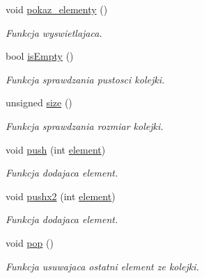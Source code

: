 \begin{DoxyCompactItemize}
void \hyperlink{classkolejka__tablica_ab6d165be6dfc519412499250722d1097}{pokaz\-\_\-elementy} ()
\begin{DoxyCompactList}\small\item\em Funkcja wyswietlajaca. \end{DoxyCompactList}\item 
bool \hyperlink{classkolejka__tablica_ad9c58be886c2a4ff8b94c135776442a4}{is\-Empty} ()
\begin{DoxyCompactList}\small\item\em Funkcja sprawdzania pustosci kolejki. \end{DoxyCompactList}\item 
unsigned \hyperlink{classkolejka__tablica_a6073b1f832606e6ff706577bc2699338}{size} ()
\begin{DoxyCompactList}\small\item\em Funkcja sprawdzania rozmiar kolejki. \end{DoxyCompactList}\item 
void \hyperlink{classkolejka__tablica_a080e798ff0e2f7168b41c96f3e46753a}{push} (int \hyperlink{classelement}{element})
\begin{DoxyCompactList}\small\item\em Funkcja dodajaca element. \end{DoxyCompactList}\item 
void \hyperlink{classkolejka__tablica_ae08cb58ee66340aeb5ef7462eaf05ed8}{pushx2} (int \hyperlink{classelement}{element})
\begin{DoxyCompactList}\small\item\em Funkcja dodajaca element. \end{DoxyCompactList}\item 
void \hyperlink{classkolejka__tablica_acba0b7dffe0511cf500dc7b4e1bcb3ee}{pop} ()
\begin{DoxyCompactList}\small\item\em Funkcja usuwajaca ostatni element ze kolejki. \end{DoxyCompactList}\end{DoxyCompactItemize}
